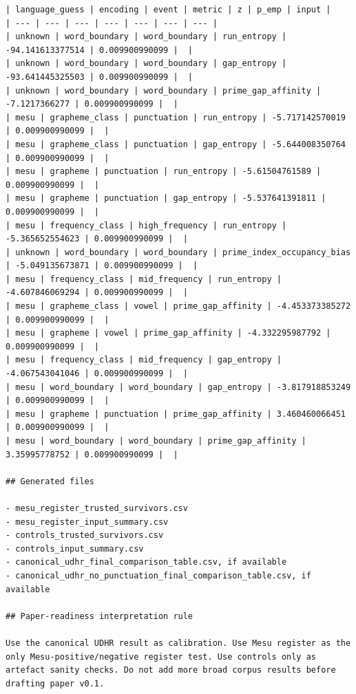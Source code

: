 \documentclass[11pt,a4paper]{article}
\begin{document}
\begin{lstlisting}
| language_guess | encoding | event | metric | z | p_emp | input |
| --- | --- | --- | --- | --- | --- | --- |
| unknown | word_boundary | word_boundary | run_entropy | -94.141613377514 | 0.009900990099 |  |
| unknown | word_boundary | word_boundary | gap_entropy | -93.641445325503 | 0.009900990099 |  |
| unknown | word_boundary | word_boundary | prime_gap_affinity | -7.1217366277 | 0.009900990099 |  |
| mesu | grapheme_class | punctuation | run_entropy | -5.717142570019 | 0.009900990099 |  |
| mesu | grapheme_class | punctuation | gap_entropy | -5.644008350764 | 0.009900990099 |  |
| mesu | grapheme | punctuation | run_entropy | -5.61504761589 | 0.009900990099 |  |
| mesu | grapheme | punctuation | gap_entropy | -5.537641391811 | 0.009900990099 |  |
| mesu | frequency_class | high_frequency | run_entropy | -5.365652554623 | 0.009900990099 |  |
| unknown | word_boundary | word_boundary | prime_index_occupancy_bias | -5.049135673871 | 0.009900990099 |  |
| mesu | frequency_class | mid_frequency | run_entropy | -4.607846069294 | 0.009900990099 |  |
| mesu | grapheme_class | vowel | prime_gap_affinity | -4.453373385272 | 0.009900990099 |  |
| mesu | grapheme | vowel | prime_gap_affinity | -4.332295987792 | 0.009900990099 |  |
| mesu | frequency_class | mid_frequency | gap_entropy | -4.067543041046 | 0.009900990099 |  |
| mesu | word_boundary | word_boundary | gap_entropy | -3.817918853249 | 0.009900990099 |  |
| mesu | grapheme | punctuation | prime_gap_affinity | 3.460460066451 | 0.009900990099 |  |
| mesu | word_boundary | word_boundary | prime_gap_affinity | 3.35995778752 | 0.009900990099 |  |

## Generated files

- mesu_register_trusted_survivors.csv
- mesu_register_input_summary.csv
- controls_trusted_survivors.csv
- controls_input_summary.csv
- canonical_udhr_final_comparison_table.csv, if available
- canonical_udhr_no_punctuation_final_comparison_table.csv, if available

## Paper-readiness interpretation rule

Use the canonical UDHR result as calibration. Use Mesu register as the only Mesu-positive/negative register test. Use controls only as artefact sanity checks. Do not add more broad corpus results before drafting paper v0.1.
\end{lstlisting}
\end{document}
